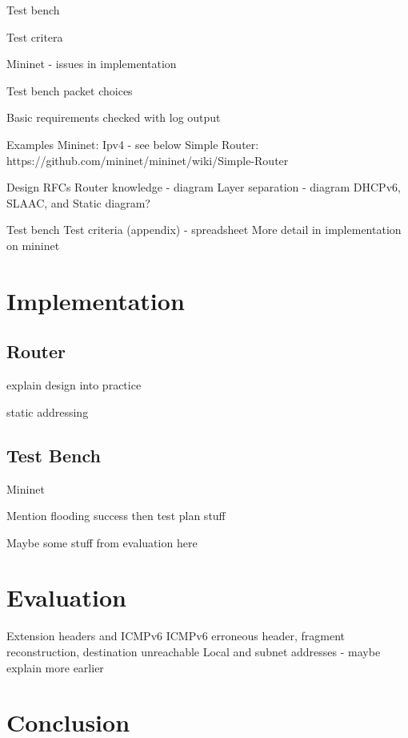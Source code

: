 \documentclass[12pt,a4paper,twoside,openright]{report}
\begin{document}
\bigskip

Test bench

\bigskip

Test critera

Mininet - issues in implementation

Test bench packet choices

Basic requirements checked with log output

Examples
Mininet: Ipv4 - see below
Simple Router: https://github.com/mininet/mininet/wiki/Simple-Router

Design
RFCs
Router knowledge - diagram
Layer separation - diagram
DHCPv6, SLAAC, and Static diagram?

Test bench
Test criteria (appendix) - spreadsheet
More detail in implementation on mininet


\chapter{Implementation}
\label{chap::implementation}

\section{Router}

explain design into practice

static addressing

\section{Test Bench}

Mininet

Mention flooding success then test plan stuff


Maybe some stuff from evaluation here

\chapter{Evaluation}

Extension headers and ICMPv6
ICMPv6 erroneous header, fragment reconstruction, destination unreachable
Local and subnet addresses - maybe explain more earlier

\chapter{Conclusion}
\end{document}
